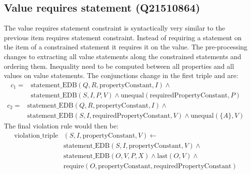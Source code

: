 \documentclass[hyperref,bachelorofscience,fleqn]{cgvpub}
\begin{document}
\subsection{Value requires statement (Q21510864)}
The value requires statement constraint is syntactically very similar to the previous item requires statement constraint. Instead of requiring a statement on the item of a constrained statement it requires it on the value. The pre-processing changes to extracting all value statements along the constrained statements and ordering them. Inequality need to be computed between all properties and all values on value statements. The conjunctions change in the first triple and are:
\begin{equation*}
\begin{split}
c_1 = &\text{statement\_EDB}(Q, R, \text{propertyConstant}, I) \wedge{} \\
&\text{statement\_EDB}(S, I, P, V) \wedge \text{unequal}(\text{requiredPropertyConstant}, P)
\end{split}
\end{equation*} \(\)
\begin{equation*}
\begin{split}
c_2 = &\text{statement\_EDB}(Q, R, \text{propertyConstant}, I) \wedge{} \\
&\text{statement\_EDB}(S, I, \text{requiredPropertyConstant}, V) \wedge \text{unequal}(\{A\}, V)
\end{split}
\end{equation*}
The final violation rule would then be:
\begin{equation*}
\begin{split}
\text{violation\_triple}&(S, I, \text{propertyConstant}, V) \leftarrow \\
&\text{statement\_EDB}(S, I, \text{propertyConstant}, V) \wedge{} \\
&\text{statement\_EDB}(O, V, P, X) \wedge \text{last}(O, V) \wedge{} \\
&\text{require}(O, \text{propertyConstant}, \text{requiredPropertyConstant})
\end{split}
\end{equation*}
\end{document}
